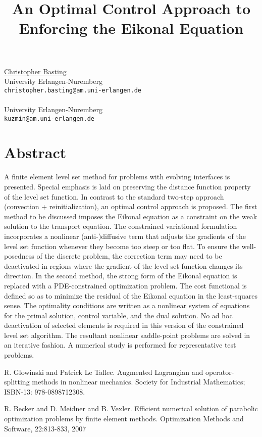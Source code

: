 \title{An Optimal Control Approach to Enforcing the Eikonal Equation}
 \author{} \institute{}
\maketitle
\begin{center}
{\large \underline{Christopher Basting}}\\
University Erlangen-Nuremberg\\
{\tt christopher.basting@am.uni-erlangen.de}
\\ \vspace{4mm}{\large Dmitri Kuzmin}\\
University Erlangen-Nuremberg\\
{\tt kuzmin@am.uni-erlangen.de}

\end{center}

\section*{Abstract}

A finite element level set method for problems with evolving interfaces is presented. Special emphasis is laid on preserving the distance function
property of the level set function. In contrast to the standard two-step
approach (convection + reinitialization), an optimal control approach is
proposed. The first method to be discussed imposes the Eikonal equation
as a constraint on the weak solution to the transport equation.
The constrained variational formulation incorporates a nonlinear
(anti-)diffusive term that adjusts the gradients of the level set
function whenever they become too steep or too flat. To ensure the
well-posedness of the discrete problem, the correction term may need
to be deactivated in regions where the gradient of the level set
function changes its direction. In the second method, the strong
form of the Eikonal equation is replaced with a PDE-constrained optimization problem. The cost functional is defined so as to
minimize the residual of the Eikonal equation in the least-squares
sense. The optimality conditions are written as a nonlinear system
of equations for the primal solution, control variable, and the dual
solution. No ad hoc deactivation of selected elements is required in
this version of the constrained level set algorithm. The resultant
nonlinear saddle-point problems are solved in an iterative fashion.
A numerical study is performed for representative test problems. 
\nocite{glowinski-tallec}
\nocite{becker-meidner-vexler}


\begin{thebibliography}{10}

{\sc R. Glowinski and Patrick Le Tallec}. {Augmented Lagrangian and operator-splitting methods in nonlinear mechanics}. Society for Industrial Mathematics; ISBN-13: 978-0898712308.

{\sc R. Becker and D. Meidner and B. Vexler}. {Efficient numerical solution of parabolic optimization problems by finite element methods}. Optimization Methods and Software, 22:813-833, 2007

\end{thebibliography}
